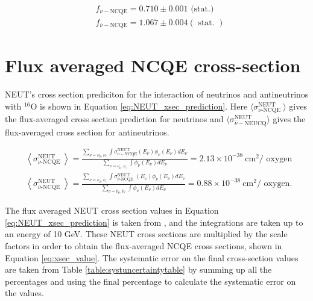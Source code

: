 \begin{equation}
    \begin{aligned}
    & f_{\nu-\mathrm{NCQE}}=0.710 \pm 0.001 \text { (stat.) } \\
    & f_{\bar{\nu}-\mathrm{NCQE}}=1.067 \pm 0.004 (\text { stat. })
    \end{aligned}
\label{eq:scale_factors_value}
\end{equation}
    


\section{Flux averaged NCQE cross-section}

NEUT's cross section prediciton for the interaction of neutrinos and antineutrinos with ${ }^{16} \mathrm{O}$ is shown in Equation \ref{eq:NEUT_xsec_prediction}. Here $\langle\sigma_{\nu \text {-NCQE }}^{\text {NEUT }}\rangle$ gives the flux-averaged cross section prediction for neutrinos and $\langle\sigma_{\bar{\nu}-\mathrm{NEUCQ}}^{\mathrm{NEUT}}\rangle$ gives the flux-averaged cross section for antineutrinos. 


\begin{equation}
    \begin{aligned}
    &\left\langle\sigma_{\nu \text {-NCQE }}^{\mathrm{NEUT}}\right\rangle= \frac{\sum_{\nu=\nu_\mu, \nu_e} \int \sigma_{\nu-\mathrm{NCQE}}^{\mathrm{NEUT}}\left(E_\nu\right) \phi_\nu\left(E_\nu\right) d E_\nu}{\sum_{\nu=\nu_\mu, \nu_e} \int \phi_\nu\left(E_\nu\right) d E_\nu}=2.13 \times 10^{-38} \mathrm{~cm}^2 / \text { oxygen } \\
    &\left\langle\sigma_{\bar{\nu} \text {-NCQE }}^{\mathrm{NEUT}}\right\rangle=\frac{\sum_{\nu=\bar{\nu}_\mu, \bar{\nu}_e} \int \sigma_{\bar{\nu} \text {-NCQE }}^{\mathrm{NEUT}}\left(E_\nu\right) \phi_\nu\left(E_\nu\right) d E_\nu}{\sum_{\nu=\bar{\nu}_\mu, \bar{\nu}_e} \int \phi_\nu\left(E_\nu\right) d E_\nu}=0.88 \times 10^{-38} \mathrm{~cm}^2 / \text { oxygen. }
    \end{aligned}
\label{eq:NEUT_xsec_prediction}
\end{equation}

The flux averaged NEUT cross section values in Equation \ref{eq:NEUT_xsec_prediction} is taken from \cite{Abe_2019}, and the integrations are taken up to an energy of 10 GeV. These NEUT cross sections are multiplied by the scale factors in order to obtain the flux-averaged NCQE cross sections, shown in Equation \ref{eq:xsec_value}. The systematic error on the final cross-section values are taken from Table \ref{table:systuncertaintytable} by summing up all the percentages and using the final percentage to calculate the systematic error on the values.


